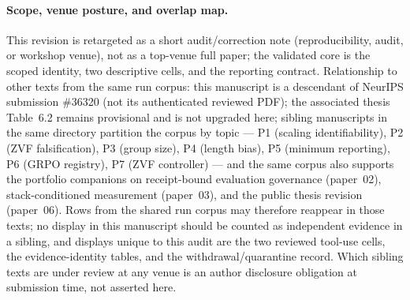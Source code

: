 \paragraph{Scope, venue posture, and overlap map.}
This revision is retargeted as a short audit/correction note (reproducibility,
audit, or workshop venue), not as a top-venue full paper; the validated core is the
scoped identity, two descriptive cells, and the reporting contract. Relationship to
other texts from the same run corpus: this manuscript is a descendant of NeurIPS
submission \#36320 (not its authenticated reviewed PDF); the associated thesis
Table~6.2 remains provisional and is not upgraded here; sibling manuscripts in the
same directory partition the corpus by topic --- P1 (scaling identifiability),
P2 (ZVF falsification), P3 (group size), P4 (length bias), P5 (minimum reporting),
P6 (GRPO registry), P7 (ZVF controller) --- and the same corpus also supports the
portfolio companions on receipt-bound evaluation governance (paper~02),
stack-conditioned measurement (paper~03), and the public thesis revision
(paper~06). Rows from the shared run corpus may therefore reappear in those texts;
no display in this manuscript should be counted as independent evidence in a
sibling, and displays unique to this audit are the two reviewed tool-use cells,
the evidence-identity tables, and the withdrawal/quarantine record. Which sibling
texts are under review at any venue is an author disclosure obligation at
submission time, not asserted here.
